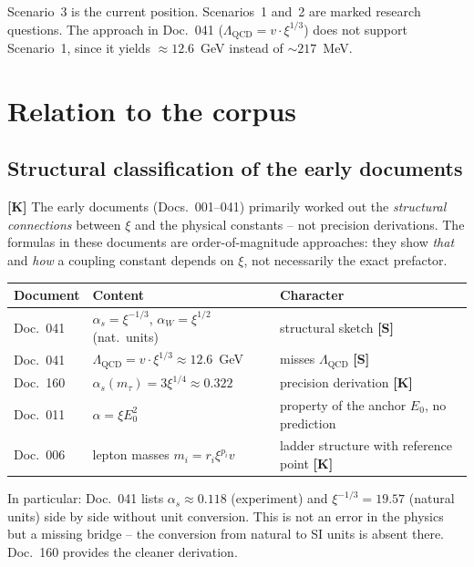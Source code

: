 Scenario~3 is the current position. Scenarios~1 and~2 are marked
research questions. The approach in Doc.~041 ($\Lambda_{\mathrm{QCD}}
= v \cdot \xi^{1/3}$) does not support Scenario~1, since it yields
$\approx 12.6$~GeV instead of $\sim 217$~MeV.

\section{Relation to the corpus}

\subsection{Structural classification of the early documents}

\textbf{[K]} The early documents (Docs.~001--041) primarily worked out
the \emph{structural connections} between $\xi$ and the physical
constants -- not precision derivations. The formulas in these documents
are order-of-magnitude approaches: they show \emph{that} and \emph{how}
a coupling constant depends on $\xi$, not necessarily the exact
prefactor.

\begin{center}
\begin{tabular}{lll}
\toprule
Document & Content & Character \\
\midrule
Doc.~041 & $\alpha_s = \xi^{-1/3}$, $\alpha_W = \xi^{1/2}$ (nat.~units)
  & structural sketch \textbf{[S]} \\
Doc.~041 & $\Lambda_{\mathrm{QCD}} = v \cdot \xi^{1/3} \approx 12.6$~GeV
  & misses $\Lambda_{\mathrm{QCD}}$ \textbf{[S]} \\
Doc.~160 & $\alpha_s(m_\tau) = 3\xi^{1/4} \approx 0.322$
  & precision derivation \textbf{[K]} \\
Doc.~011 & $\alpha = \xi E_0^2$
  & property of the anchor $E_0$, no prediction \\
Doc.~006 & lepton masses $m_i = r_i\xi^{p_i}v$
  & ladder structure with reference point \textbf{[K]} \\
\bottomrule
\end{tabular}
\end{center}

In particular: Doc.~041 lists $\alpha_s \approx 0.118$ (experiment)
and $\xi^{-1/3} = 19.57$ (natural units) side by side without unit
conversion. This is not an error in the physics but a missing bridge --
the conversion from natural to SI units is absent there. Doc.~160
provides the cleaner derivation.

